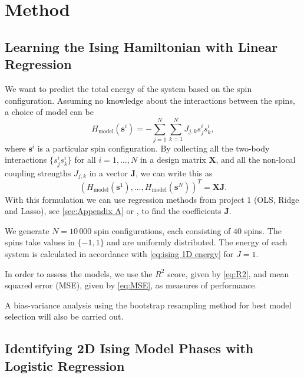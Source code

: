 \section{Method}\label{sec:Method}

\subsection{Learning the Ising Hamiltonian with Linear Regression}\label{sec:method linreg}
We want to predict the total energy of the system based on the spin configuration. Assuming no knowledge about the interactions between the spins, a choice of model can be
\begin{equation}\label{eq:general}
    H_{\text{model}}(\mathbf{s}^i) = -\sum_{j=1}^N\sum_{k=1}^N J_{j,k}s_j^is_k^i,
\end{equation}
where $\mathbf{s}^i$ is a particular spin configuration. By collecting all the two-body interactions $\{s_j^is_k^i\}$ for all $i=1,\ldots,N$ in a design matrix $\mathbf{X}$, and all the non-local coupling strengths $J_{j,k}$ in a vector $\mathbf{J}$, we can write this as
\begin{equation*}
    (H_{\text{model}}(\mathbf{s}^1), \ldots, H_{\text{model}}(\mathbf{s}^N))^T = \mathbf{X}\mathbf{J}.
\end{equation*}
With this formulation we can use regression methods from project 1 (OLS, Ridge and Lasso), see \autoref{sec:Appendix A} or \cite{PROJone}, to find the coefficients $\mathbf{J}$.

We generate $N = 10\,000$ spin configurations, each consisting of $40$ spins. The spins take values in $\{-1,1\}$ and are uniformly distributed. The energy of each system is calculated in accordance with \cref{eq:ising 1D energy} for $J=1$.

In order to assess the models, we use the $R^2$ score, given by \autoref{eq:R2}, and mean squared error (MSE), given by \autoref{eq:MSE}, as measures of performance. 

A bias-variance analysis using the bootstrap resampling method for best model selection will also be carried out.

\subsection{Identifying 2D Ising Model Phases with Logistic Regression}\label{sec:method logreg}

